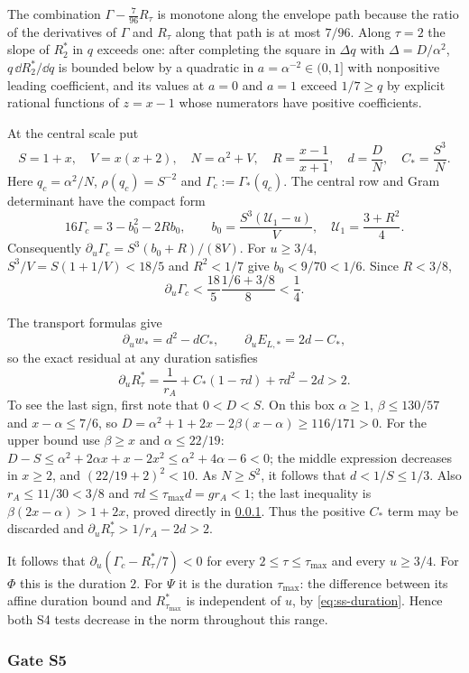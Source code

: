  The combination $\Gamma-\frac{7}{96}R_\tau$ is monotone along the envelope path
because the ratio of the derivatives of $\Gamma$ and $R_\tau$ along that path is at most $7/96$.
Along $\tau=2$ the slope of $R^*_2$ in $q$ exceeds one: after completing the square in $\Delta q$
with $\Delta=D/\alpha^2$, $q\,\dd R^*_2/\dd q$ is bounded below by a quadratic in
$a=\alpha^{-2}\in(0,1]$ with nonpositive leading coefficient, and its values at $a=0$ and $a=1$
exceed $1/7\ge q$ by explicit rational functions of $z=x-1$ whose numerators have positive
coefficients.

 At the central scale put
\[
 S=1+x,\quad V=x(x+2),\quad N=\alpha^2+V,\quad
 R=\frac{x-1}{x+1},\quad d=\frac DN,\quad C_*=\frac{S^3}{N}.
\]
Here $q_c=\alpha^2/N$, $\rho(q_c)=S^{-2}$ and $\Gamma_c:=\Gamma_*(q_c)$.
The central row and Gram determinant have the compact form
\[
 16\Gamma_c=3-b_0^2-2Rb_0,\qquad
 b_0=\frac{S^3(\mathcal U_1-u)}V,\quad
 \mathcal U_1=\frac{3+R^2}{4}.
\]
Consequently $\partial_u\Gamma_c=S^3(b_0+R)/(8V)$.
For $u\ge3/4$, $S^3/V=S(1+1/V)<18/5$ and $R^2<1/7$ give
$b_0<9/70<1/6$. Since $R<3/8$,
\[
 \partial_u\Gamma_c<\frac{18}{5}\frac{1/6+3/8}{8}<\frac14.
\]

The transport formulas give
\[
 \partial_uw_*=d^2-dC_*,\qquad
 \partial_uE_{L,*}=2d-C_*,
\]
so the exact residual at any duration satisfies
\[
 \partial_uR^*_\tau
 =\frac1{r_A}+C_*(1-\tau d)+\tau d^2-2d>2.
\]
To see the last sign, first note that $0<D<S$.
On this box $\alpha\ge1$, $\beta\le130/57$ and $x-\alpha\le7/6$, so
$D=\alpha^2+1+2x-2\beta(x-\alpha)\ge116/171>0$.
For the upper bound use $\beta\ge x$ and
$\alpha\le22/19$:
$D-S\le\alpha^2+2\alpha x+x-2x^2\le\alpha^2+4\alpha-6<0$;
the middle expression decreases in $x\ge2$, and $(22/19+2)^2<10$.
As $N\ge S^2$, it follows that $d<1/S\le1/3$.
Also $r_A\le11/30<3/8$ and
$\tau d\le\tau_{\max}d=gr_A<1$; the last inequality is
$\beta(2x-\alpha)>1+2x$, proved directly in \cref{app:ss-S5}.
Thus the positive $C_*$ term may be discarded and
$\partial_uR^*_\tau>1/r_A-2d>2$.

It follows that $\partial_u(\Gamma_c-R^*_\tau/7)<0$ for every
$2\le\tau\le\tau_{\max}$ and every $u\ge3/4$.
For $\Phi$ this is the duration $2$. For $\Psi$ it is the duration $\tau_{\max}$:
the difference between its affine duration bound and $R^*_{\tau_{\max}}$ is independent of $u$,
by \eqref{eq:ss-duration}. Hence both S4 tests decrease in the norm throughout this range.

\subsubsection{Gate S5}\label{app:ss-S5}

